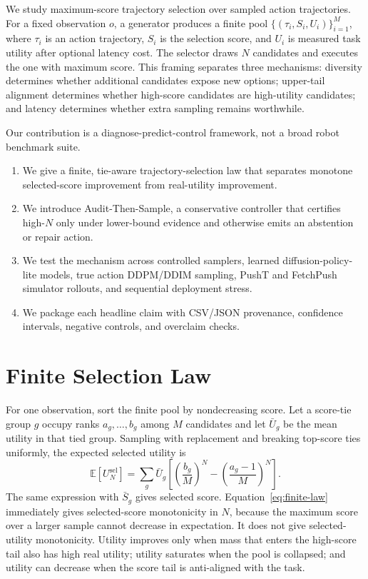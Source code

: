 \documentclass{article}
\newcommand{\ats}{Audit-Then-Sample}
\begin{document}
We study maximum-score trajectory selection over sampled action trajectories. For a fixed observation $o$, a generator produces a finite pool $\{(\tau_i,S_i,U_i)\}_{i=1}^M$, where $\tau_i$ is an action trajectory, $S_i$ is the selection score, and $U_i$ is measured task utility after optional latency cost. The selector draws $N$ candidates and executes the one with maximum score. This framing separates three mechanisms: diversity determines whether additional candidates expose new options; upper-tail alignment determines whether high-score candidates are high-utility candidates; and latency determines whether extra sampling remains worthwhile.

Our contribution is a diagnose-predict-control framework, not a broad robot benchmark suite.

\begin{enumerate}
\item We give a finite, tie-aware trajectory-selection law that separates monotone selected-score improvement from real-utility improvement.
\item We introduce \ats{}, a conservative controller that certifies high-$N$ only under lower-bound evidence and otherwise emits an abstention or repair action.
\item We test the mechanism across controlled samplers, learned diffusion-policy-lite models, true action DDPM/DDIM sampling, PushT and FetchPush simulator rollouts, and sequential deployment stress.
\item We package each headline claim with CSV/JSON provenance, confidence intervals, negative controls, and overclaim checks.
\end{enumerate}

\section{Finite Selection Law}

For one observation, sort the finite pool by nondecreasing score. Let a score-tie group $g$ occupy ranks $a_g,\ldots,b_g$ among $M$ candidates and let $\bar U_g$ be the mean utility in that tied group. Sampling with replacement and breaking top-score ties uniformly, the expected selected utility is
\begin{equation}
\mathbb{E}[U_{N}^{\mathrm{sel}}]
= \sum_g \bar U_g
\left[
\left(\frac{b_g}{M}\right)^N
- \left(\frac{a_g-1}{M}\right)^N
\right].
\label{eq:finite-law}
\end{equation}
The same expression with $\bar S_g$ gives selected score. Equation~\ref{eq:finite-law} immediately gives selected-score monotonicity in $N$, because the maximum score over a larger sample cannot decrease in expectation. It does not give selected-utility monotonicity. Utility improves only when mass that enters the high-score tail also has high real utility; utility saturates when the pool is collapsed; and utility can decrease when the score tail is anti-aligned with the task.
\end{document}
